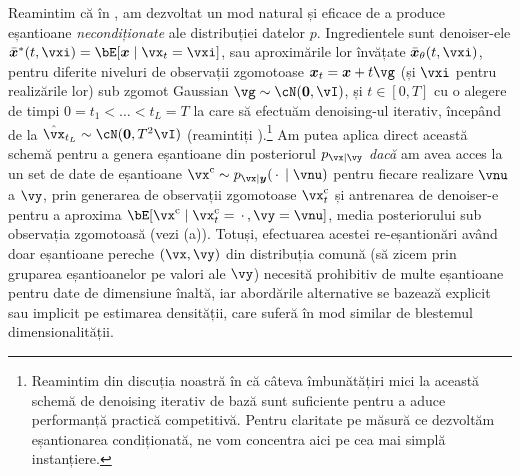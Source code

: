 \documentclass[../../book-main_ro.tex]{subfiles}
\begin{document}
Reamintim că în , am dezvoltat un mod natural și
eficace de a produce eșantioane \textit{necondiționate} ale distribuției datelor
$p$. Ingredientele sunt denoiser-ele $\bar{\x}^\ast(t, \vxi) = \bE[ \x \mid
\vx_t=\vxi ]$, sau aproximările lor învățate $\bar{\x}_{\theta}(t, \vxi)$,
pentru diferite niveluri de observații zgomotoase $\x_t = \x + t \vg$ (și $\vxi$ pentru
realizările lor) sub
zgomot Gaussian $\vg \sim \cN(\mathbf{0}, \vI)$, și $t \in
[0, T]$ cu o alegere de timpi $0 = t_1 < \hdots < t_{L} = T$ la care să
efectuăm denoising-ul iterativ, începând de la $\hat{\vx}_{t_L} \sim
\cN(\mathbf{0}, T^2 \vI)$ (reamintiți ).\footnote{Reamintim din discuția noastră în 
că câteva îmbunătățiri mici la această schemă de denoising iterativ de bază sunt
suficiente pentru a aduce performanță practică competitivă. Pentru claritate pe măsură ce dezvoltăm
eșantionarea condiționată, ne vom concentra aici pe cea mai simplă instanțiere.}
Am putea aplica direct această schemă pentru a genera eșantioane din posteriorul
$p_{\vx \mid \vy}$ \textit{dacă} am avea acces la un set de date de eșantioane
$\posteriorsample \sim p_{\vx \mid \y}(\spcdot \mid \vnu)$ pentru fiecare realizare
$\vnu$ a $\vy$, prin generarea de observații zgomotoase
$\posteriorsample_t$ și antrenarea de denoiser-e pentru a aproxima $\bE[
  \posteriorsample \mid \posteriorsample_t=\spcdot, \vy=\vnu ]$, media posteriorului sub
observația zgomotoasă (vezi (a)).
Totuși, efectuarea acestei re-eșantionări având doar eșantioane pereche $(\vx, \vy)$ din distribuția
comună (să zicem prin gruparea eșantioanelor pe valori ale $\vy$) necesită
prohibitiv de multe eșantioane pentru date de dimensiune înaltă, iar abordările alternative
se bazează explicit sau implicit pe estimarea densității, care suferă în mod similar de
blestemul dimensionalității.
\end{document}
